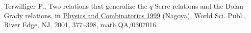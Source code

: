 Terwilliger P.,
Two relations that generalize the $q$-Serre relations and the  Dolan--Grady relations,
in  \href{http://dx.doi.org/10.1142/9789812810199_0013}{Physics and Combinatorics 1999} (Nagoya), World Sci. Publ., River Edge, NJ, 2001, 377--398,
\href{http://arxiv.org/abs/math.QA/0307016}{math.QA/0307016}.
